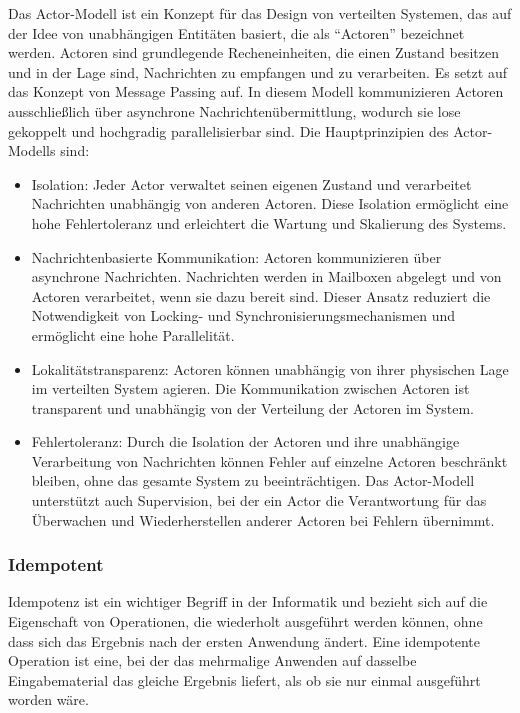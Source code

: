 Das Actor-Modell ist ein Konzept für das Design von verteilten Systemen, das auf der Idee von unabhängigen Entitäten basiert, die als \enquote{Actoren} bezeichnet werden. Actoren sind grundlegende Recheneinheiten, die einen Zustand besitzen und in der Lage sind, Nachrichten zu empfangen und zu verarbeiten. Es setzt auf das Konzept von Message Passing auf. In diesem Modell kommunizieren Actoren ausschließlich über asynchrone Nachrichtenübermittlung, wodurch sie lose gekoppelt und hochgradig parallelisierbar sind. Die Hauptprinzipien des Actor-Modells sind:
\begin{itemize}
\item Isolation: Jeder Actor verwaltet seinen eigenen Zustand und verarbeitet Nachrichten unabhängig von anderen Actoren. Diese Isolation ermöglicht eine hohe Fehlertoleranz und erleichtert die Wartung und Skalierung des Systems.

\item Nachrichtenbasierte Kommunikation: Actoren kommunizieren über asynchrone Nachrichten. Nachrichten werden in Mailboxen abgelegt und von Actoren verarbeitet, wenn sie dazu bereit sind. Dieser Ansatz reduziert die Notwendigkeit von Locking- und Synchronisierungsmechanismen und ermöglicht eine hohe Parallelität.

\item Lokalitätstransparenz: Actoren können unabhängig von ihrer physischen Lage im verteilten System agieren. Die Kommunikation zwischen Actoren ist transparent und unabhängig von der Verteilung der Actoren im System.

\item Fehlertoleranz: Durch die Isolation der Actoren und ihre unabhängige Verarbeitung von Nachrichten können Fehler auf einzelne Actoren beschränkt bleiben, ohne das gesamte System zu beeinträchtigen. Das Actor-Modell unterstützt auch Supervision, bei der ein Actor die Verantwortung für das Überwachen und Wiederherstellen anderer Actoren bei Fehlern übernimmt.
\end{itemize}


\subsubsection{Idempotent}

Idempotenz ist ein wichtiger Begriff in der Informatik und bezieht sich auf die Eigenschaft von Operationen, die wiederholt ausgeführt werden können, ohne dass sich das Ergebnis nach der ersten Anwendung ändert. Eine idempotente Operation ist eine, bei der das mehrmalige Anwenden auf dasselbe Eingabematerial das gleiche Ergebnis liefert, als ob sie nur einmal ausgeführt worden wäre.

